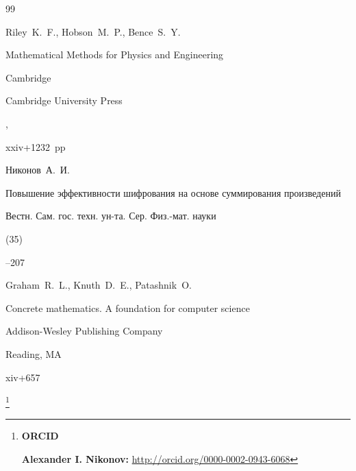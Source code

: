 \begin{thebibliography}{99}

\by Riley~K.~F., Hobson~M.~P., Bence~S.~Y.

\book Mathematical Methods for Physics and Engi\-nee\-ring

\publaddr Cambridge

\publ Cambridge University Press

, 


xxiv+1232~pp





\by Никонов~А.~И.

\paper Повышение эффективности шифрования на основе суммирования произведений

\jour Вестн. Сам. гос. техн. ун-та. Сер. Физ.-мат. науки


(35)

--207






\by Graham~R.~L., Knuth~D.~E., Patashnik~O.

\book Concrete mathematics. A foundation for computer science

\publ Addison-Wesley Publishing Company

\publaddr Reading, MA


\totalpages xiv+657 





\end{thebibliography}



\RuDate



\bigskip



\makeentitle







\thanks{{\bf ORCID}



{\bf Alexander I. Nikonov:} \url{http://orcid.org/0000-0002-0943-6068}



}





